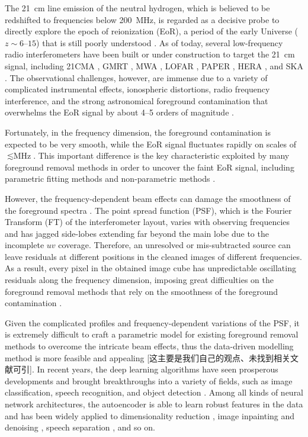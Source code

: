 \documentclass[letters,a4paper,fleqn,usenatbib]{mnras}
\begin{document}
The \SI{21}{\cm} line emission of the neutral hydrogen,
which is believed to be redshifted to frequencies below \SI{200}{\MHz},
is regarded as a decisive probe to directly explore the epoch of
reionization (EoR), a period of the early Universe
($z \sim \numrange{6}{15}$) that is still poorly understood
\citep[see][for reviews]{furlanetto2006rev,furlanetto2016rev}.
As of today, several low-frequency radio interferometers have been built
or under construction to target the \SI{21}{\cm} signal, including
21CMA \citep{zheng2016}, GMRT \citep{paciga2011}, MWA \citep{tingay2013},
LOFAR \citep{vanHaarlem2013}, PAPER \citep{parsons2010},
HERA \citep{deboer2017}, and SKA \citep{koopmans2015rev}.
The observational challenges, however, are immense due to a variety of
complicated instrumental effects, ionospheric distortions, radio frequency
interference, and the strong astronomical foreground contamination that
overwhelms the EoR signal by about \numrange{4}{5} orders of magnitude
\citep[see][for a review]{morales2010rev}.

Fortunately, in the frequency dimension, the foreground contamination
is expected to be very smooth, while the EoR signal fluctuates rapidly
on scales of $\lesssim \si{\MHz}$.
This important difference is the key characteristic exploited by many
foreground removal methods in order to uncover the faint EoR signal,
including
parametric fitting methods \citep[e.g.,][]{wang2006,liu2009fgrm,wang2013}
and non-parametric methods \citep[e.g.,][]{harker2009,chapman2013,mertens2018}.

However, the frequency-dependent beam effects can damage the smoothness
of the foreground spectra \citep{liu2009ps}.
The point spread function (PSF), which is the Fourier Transform (FT)
of the interferometer layout, varies with observing frequencies and
has jagged side-lobes extending far beyond the main lobe due to the
incomplete $uv$ coverage.
Therefore, an unresolved or mis-subtracted source can leave residuals
at different positions in the cleaned images of different frequencies.
As a result, every pixel in the obtained image cube has unpredictable
oscillating residuals along the frequency dimension, imposing great
difficulties on the foreground removal methods that rely on the
smoothness of the foreground contamination \citep[see also][]{liu2009ps}.

Given the complicated profiles and frequency-dependent variations of
the PSF, it is extremely difficult to craft a parametric model for
existing foreground removal methods to overcome the intricate beam
effects, thus the data-driven modelling method is more feasible and
appealing [这主要是我们自己的观点、未找到相关文献可引].
In recent years, the deep learning algorithms have seen prosperous
developments and brought breakthroughs into a variety of fields, such
as image classification, speech recognition, and object detection
\citep[see][for a recent review]{lecun2015}.
Among all kinds of neural network architectures, the autoencoder
is able to learn robust features in the data \citep{vincent2008}
and has been widely applied to
dimensionality reduction \citep{hinton2006},
image inpainting and denoising \citep{suganuma2018},
speech separation \citep{grais2017}, and so on.
\end{document}

